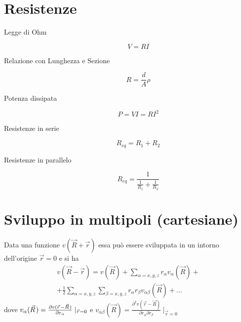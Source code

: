 \documentclass[a4paper,10pt]{article}
\begin{document}
\begin{multicols}{2}
\section{Resistenze}
\begin{description}
  \item[Legge di Ohm]
    \begin{equation*}
      V=RI
    \end{equation*}
  \item[Relazione con Lunghezza e Sezione]
    \begin{equation*}
      R=\frac dA \rho
    \end{equation*}
  \item[Potenza dissipata]
    \begin{equation*}
      P=VI=RI^2
    \end{equation*}
  \item[Resistenze in serie]
    \begin{equation*}
      R_{eq} = R_1 + R_2
    \end{equation*}
  \item[Resistenze in parallelo]
    \begin{equation*}
      R_{eq} = \frac{1}{\frac{1}{R_1} + \frac{1}{R_2}}
    \end{equation*}
\end{description}

\section{Sviluppo in multipoli (cartesiane)}
Data una funzione $v(\vec R + \vec r)$ essa può essere sviluppata in un
intorno dell'origine $\vec r = 0$ e si ha
\begin{align*}
  v(\vec R - \vec r) = v(\vec R) + \sum_{\alpha = x,y,z} r_\alpha v_\alpha(\vec R) + \\
  + \frac{1}{2} \sum_{\alpha = x,y,z} \sum_{\beta = x,y,z} r_\alpha r_\beta v_{\alpha \beta}(\vec R) + \ldots
\end{align*}
dove $v_\alpha(\vec R) = \dep{v(\vec r - \vec R)}{r_\alpha}\mid_{\vec r = 0}$
e $v_{\alpha\beta}(\vec R) = \frac{\partial^2 v(\vec r - \vec R)}{\partial r_\alpha \partial r_\beta} \mid_{\vec r = 0}$


\end{multicols}
\end{document}
